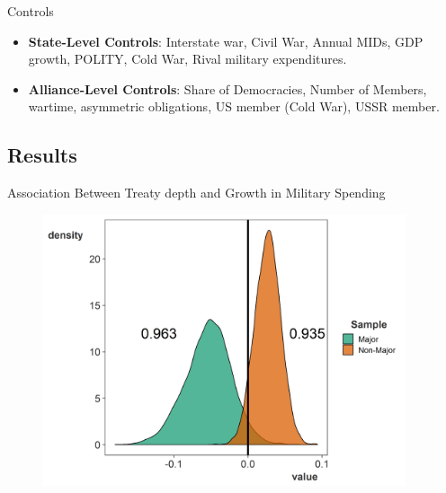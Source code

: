 \documentclass[12pt]{beamer}
\begin{document}

\begin{frame}{Controls}

\begin{itemize}
\item \textbf{State-Level Controls}: Interstate war, Civil War, Annual MIDs, GDP growth, POLITY, Cold War, Rival military expenditures. 
\pause 
\item \textbf{Alliance-Level Controls}: Share of Democracies, Number of Members, wartime, asymmetric obligations, US member (Cold War), USSR member.

\end{itemize} 

\end{frame}



\subsection{Results}


\begin{frame}{Association Between Treaty depth and Growth in Military Spending} 

\begin{figure}
	\centering
		\includegraphics[width=0.95\textwidth]{str-post.png}
	\label{fig:str-post}
\end{figure}


\end{frame}
\end{document}

